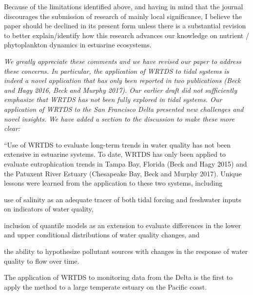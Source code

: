 \documentclass[letterpaper,12pt]{article}
\begin{document}
Because of the limitations identified above, and having in mind that the journal discourages the submission of research of mainly local significance, I believe the paper should be declined in its present form unless there is a substantial revision to better explain/identify how this research advances our knowledge on nutrient / phytoplankton dynamics in estuarine ecosystems. 

{\it We greatly appreciate these comments and we have revised our paper to address these concerns.  In particular, the application of WRTDS to tidal systems is indeed a novel application that has only been reported in two publications (Beck and Hagy 2016, Beck and Murphy 2017).  Our earlier draft did not sufficiently emphasize that WRTDS has not been fully explored in tidal systems. Our application of WRTDS to the San Francisco Delta presented new challenges and novel insights.  We have added a section to the discussion to make these more clear:

``Use of WRTDS to evaluate long-term trends in water quality has not been extensive in estuarine systems.  To date, WRTDS has only been applied to evaluate eutrophication trends in Tampa Bay, Florida (Beck and Hagy 2015) and the Patuxent River Estuary (Chesapeake Bay, Beck and Murphy 2017). Unique lessons were learned from the application to these two systems, including \begin{inparaenum}[1\upshape)]  
\item use of salinity as an adequate tracer of both tidal forcing and freshwater inputs on indicators of water quality, 
\item inclusion of quantile models as an extension to evaluate differences in the lower and upper conditional distributions of water quality changes, and 
\item the ability to hypothesize pollutant sources with changes in the response of water quality to flow over time. 
\end{inparaenum}
The application of WRTDS to monitoring data from the Delta is the first to apply the method to a large temperate estuary on the Pacific coast.  

}
\end{document}
